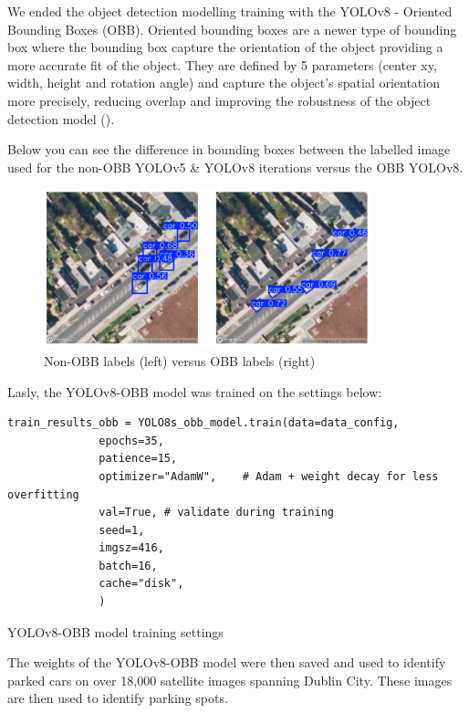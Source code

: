We ended the object detection modelling training with the YOLOv8 - Oriented
Bounding Boxes (OBB).
Oriented bounding boxes are a newer type of bounding box where the bounding box
capture the orientation of the object providing a more accurate fit of the
object. They are defined by 5 parameters (center xy, width, height and rotation
angle) and capture the object's spatial orientation more precisely, reducing
overlap and improving the robustness of the object detection model
(\cite{obblit}).

\newpage{}
Below you can see the difference in bounding boxes between the labelled image
used for the non-OBB YOLOv5 \& YOLOv8 iterations versus the OBB YOLOv8.

\begin{figure}[htbp]
  \centering
  \includegraphics[width=0.85\textwidth]{images/obb-vs-nonobb-img.png}
  \caption{Non-OBB labels (left) versus OBB labels (right)}
\end{figure}

Lasly, the YOLOv8-OBB model was trained on the settings below:

\begin{listing}[htbp]
  \centering
  \begin{verbatim}
train_results_obb = YOLO8s_obb_model.train(data=data_config,
              epochs=35,
              patience=15,
              optimizer="AdamW",    # Adam + weight decay for less overfitting
              val=True, # validate during training
              seed=1,
              imgsz=416,
              batch=16,
              cache="disk",
              )
  \end{verbatim}
  \caption{YOLOv8-OBB model training settings}
\end{listing}

The weights of the YOLOv8-OBB model were then saved and used to identify parked
cars on over 18,000 satellite images spanning Dublin City. These images are then
used to identify parking spots.

